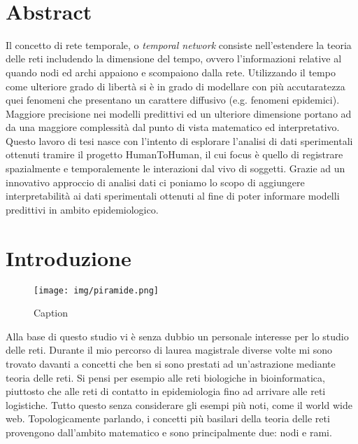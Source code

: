 \documentclass[12pt,twoside]{report}
\begin{document}
	
	\newpage\
	\pagestyle{empty}
	
	\pagestyle{fancy}
	\fancyhf{}
	\fancyhead[LE, RO]{\thepage}
	\fancyhead[RE, LO]{\normalsize\color{black}\leftmark}
	\tableofcontents
	\chapter{Abstract} %
	Il concetto di rete temporale, o \textit{temporal network} consiste nell'estendere la teoria delle reti includendo la dimensione del tempo, ovvero l'informazioni relative al quando nodi ed archi appaiono e scompaiono dalla rete. Utilizzando il tempo come ulteriore grado di libertà si è in grado di modellare con più accutaratezza quei fenomeni che presentano un carattere diffusivo (e.g. fenomeni epidemici). Maggiore precisione nei modelli predittivi ed un ulteriore dimensione portano ad da una maggiore complessità dal punto di vista matematico ed interpretativo. Questo lavoro di tesi nasce con l'intento di esplorare l'analisi di dati sperimentali ottenuti tramire il progetto HumanToHuman, il cui focus è quello di registrare spazialmente e temporalemente le interazioni dal vivo di soggetti. Grazie ad un innovativo approccio di analisi dati ci poniamo lo scopo di aggiungere interpretabilità ai dati sperimentali ottenuti al fine di poter informare modelli predittivi in ambito epidemiologico.
	
	\chapter{Introduzione}
	\begin{figure}[h]
	    \centering
	    \texttt{[image: img/piramide.png]}
	    \caption{Caption}
	    \label{fig:my_label}
	\end{figure}
	\FloatBarrier
	Alla base di questo studio vi è senza dubbio un personale interesse per lo studio delle reti. Durante il mio percorso di laurea magistrale diverse volte mi sono trovato davanti a concetti che ben si sono prestati ad un'astrazione mediante teoria delle reti. Si pensi per esempio alle reti biologiche in bioinformatica, piuttosto che alle reti di contatto in epidemiologia fino ad arrivare alle reti logistiche. Tutto questo senza considerare gli esempi più noti, come il world wide web. 
	Topologicamente parlando, i concetti più basilari della teoria delle reti provengono dall'ambito matematico e sono principalmente due: nodi e rami.
\end{document}
